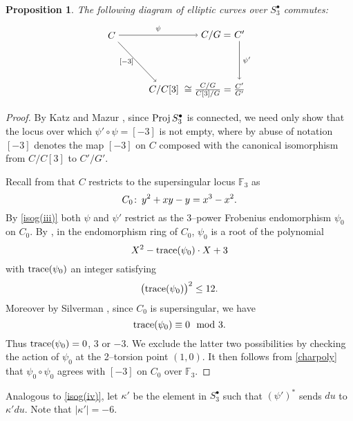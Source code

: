 \documentclass[microtype]{gtpart}     %
\newtheorem{prop}{Proposition}[section]
\theoremstyle{remark}
\theoremstyle{definition}
\def\co{\colon\thinspace}
\newcommand{\mb}[1]{\mathbb{#1}}
\newcommand{\Proj}{{\rm Proj\thinspace}}
\newcommand{\BF}{{\mb F}}
\newcommand{\md}{~~{\rm mod}~}
\newcommand{\K}{\kappa}
\newcommand{\s}{S^\bullet}
\newcommand{\isog}[1]{\fullref{prop:isog}\thinspace \eqref{isog(#1)}}
\begin{document}
\begin{prop}
\label{prop:frob^2}
 The following diagram of elliptic curves over $\s_3$ commutes: 
 \begin{equation}
 \label{frob^2}
  \begin{tikzpicture}[baseline=(current bounding box.center)]
          \node (LT) at (0, 2) {$C$}; 
          \node (MT) at (3.8, 2) {$C/G = $}; 
          \node (RT) at (4.65, 2.04) {$C'$}; 
          \node (LB) at (1.9, 0) {$C/C[3]$}; 
          \node (MB) at (3.5, 0) {$\cong \frac{C/G}{C[3]/G} = $}; 
          \node (RB) at (4.65, 0.025) {$\frac{C'}{G'}$}; 
          \draw [->] (LT) -- node [above] {$\scriptstyle \psi$} (MT); 
          \draw [->] (LT) -- node [left] {$\scriptstyle [-3]$} (LB); 
          \draw [->] (RT) -- node [right] {$\scriptstyle \psi'$} (RB); 
  \end{tikzpicture}
 \end{equation}
\end{prop}
\begin{proof}
 By Katz and Mazur \cite[Theorem 2.4.2]{KM}, since $\Proj \s_3$ is connected, 
 we need only show that the locus over which $\psi' \circ \psi = [-3]$ is not 
 empty, where by abuse of notation $[-3]$ denotes the map $[-3]$ on $C$ 
 composed with the canonical isomorphism from $C/C[3]$ to $C'/G'$.  

 Recall from  that $C$ restricts to the supersingular 
 locus $\BF_3$ as 
 \[
  C_0 \co y^2 + x y - y = x^3 - x^2.  
 \]
 By \isog{iii} both $\psi$ and $\psi'$ restrict as the 3--power Frobenius 
 endomorphism $\psi_0$ on $C_0$.  By \cite[Theorem 2.6.3]{KM}, in the 
 endomorphism ring of $C_0$, $\psi_0$ is a root of the polynomial 
 \begin{equation}
 \label{charpoly}
  X^2 - {\rm trace}(\psi_0) \cdot X + 3 
 \end{equation}
 with ${\rm trace}(\psi_0)$ an integer satisfying 
 \[
  \big( {\rm trace}(\psi_0) \big)^2 \leq 12.  
 \]
 Moreover by Silverman \cite[Exercise 5.10a]{AEC}, since $C_0$ is 
 supersingular, we have 
 \[
  {\rm trace}(\psi_0) \equiv 0 \md 3.  
 \]
 Thus ${\rm trace}(\psi_0) = 0$, 3 or $-3$.  We exclude the latter two 
 possibilities by checking the action of $\psi_0$ at the 2--torsion point 
 $(1,0)$.  It then follows from \eqref{charpoly} that $\psi_0 \circ \psi_0$ 
 agrees with $[-3]$ on $C_0$ over $\BF_3$.  
\end{proof}

Analogous to \isog{iv}, let $\K'$ be the element in $\s_3$ such that 
$(\psi')^*$ sends $du$ to $\K' du$.  Note that $|\K'| = -6$.  
\end{document}
